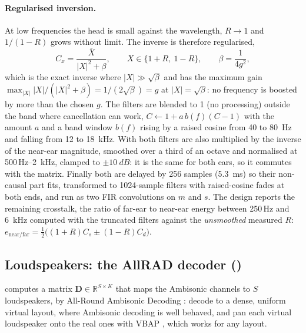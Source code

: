 \paragraph{Regularised inversion.} At low frequencies the head is small against the wavelength, $R\to1$ and
$1/(1-R)$ grows without limit. The inverse is therefore regularised,
\begin{equation}
  C_x = \frac{\overline{X}}{|X|^2 + \beta},\qquad X\in\{1+R,\ 1-R\},\qquad \beta = \frac{1}{4g^2},
\end{equation}
which is the exact inverse where $|X|\gg\sqrt\beta$ and has the maximum gain $\max_{|X|}|X|/(|X|^2+\beta) = 1/(2\sqrt\beta) = g$
at $|X| = \sqrt\beta$: no frequency is boosted by more than the chosen  $g$. The filters are blended
to 1 (no processing) outside the band where cancellation can work, $C\leftarrow 1 + a\,b(f)(C-1)$ with the amount $a$ and
a band window $b(f)$ rising by a raised cosine from 40 to \SI{80}{Hz} and falling from 12 to \SI{18}{kHz}. With
 both filters are also multiplied by the inverse of the near-ear magnitude, smoothed over a
third of an octave and normalised at 500\,Hz--\SI{2}{kHz}, clamped to $\pm\SI{10}{dB}$: it is the same for both ears,
so it commutes with the matrix. Finally both are delayed by 256 samples (\SI{5.3}{ms}) so their non-causal part fits,
transformed to 1024-sample filters with raised-cosine fades at both ends, and run as two FIR convolutions on $m$ and
$s$. The design reports the remaining crosstalk, the ratio of far-ear to near-ear energy between 250\,Hz and
\SI{6}{kHz} computed with the truncated filters against the \emph{unsmoothed} measured $R$:
$e_\mathrm{near/far} = \tfrac12\bigl((1+R)C_s \pm (1-R)C_d\bigr)$.

\subsection{Loudspeakers: the AllRAD decoder ()}
\label{sec:math-allrad}
 computes a matrix $\mathbf D\in\mathbb R^{S\times K}$ that maps the Ambisonic channels to $S$
loudspeakers, by All-Round Ambisonic Decoding \citep{zotter2012allrad}: decode to a dense, uniform virtual layout,
where Ambisonic decoding is well behaved, and pan each virtual loudspeaker onto the real ones with VBAP
\citep{pulkki1997vbap}, which works for any layout.

